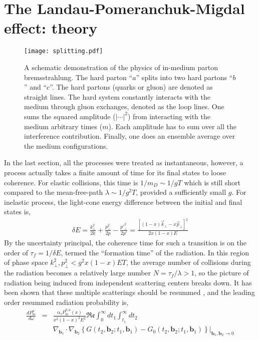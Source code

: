 \section{The Landau-Pomeranchuk-Migdal effect: theory}
\begin{figure}
\centering
\texttt{[image: splitting.pdf]}
\caption{A schematic demonstration of the physics of in-medium parton bremsstrahlung. The hard parton ``$a$'' splits into two hard partons ``$b$'' and ``$c$''. The hard partons (quarks or gluon) are denoted as straight lines. The hard system constantly interacts with the medium through gluon exchanges, denoted as the loop lines. One sums the squared amplitude ($|\cdots|^2$) from interacting with the medium arbitrary times ($m$). Each amplitude has to sum over all the interference contribution.
Finally, one does an ensemble average over the medium configurations.}
\label{fig:split}
\end{figure}
In the last section, all the processes were treated as instantaneous, however, a process actually takes a finite amount of time for its final states to loose coherence. 
For elastic collisions, this time is $1/m_D \sim 1/gT$ which is still short compared to the mean-free-path $\lambda \sim 1/g^2 T$, provided a sufficiently small $g$.
For inelastic process, the light-cone energy difference between the initial and final states is,
\begin{eqnarray}
\delta E = \frac{k_\perp^2}{2k} + \frac{p_\perp^2}{2p} - \frac{{p'}_\perp^2}{2{p'}} = \frac{ [(1-x)\vec{k}_\perp - x\vec{p}_\perp]^2}{2x(1-x)E}
\end{eqnarray}
By the uncertainty principal, the coherence time for such a transition is on the order of $\tau_f = 1/\delta E$, termed the ``formation time'' of the radiation. 
In this region of phase space $k_\perp^2, p_\perp^2 < g^2x(1-x)ET$, the average number of collisions during the radiation becomes a relatively large number $N = \tau_f/\lambda >1$, so the picture of radiation being induced from independent scattering centers breaks down.
It has been shown that these multiple scatterings should be resummed \cite{Zakharov:1996fv,Zakharov:1997uu,Baier:1996kr}, and the leading order resummed radiation probability is,
\begin{eqnarray}
\frac{dP^{a}_{bc}}{d\omega} &=& \frac{\alpha_s P^{0,a}_{bc}(x)}{x^2(1-x)^2 E^2}\mathfrak{Re}\int_0^\infty dt_1 \int_{t_1}^{\infty} dt_2\\\nonumber &&\nabla_{\mathbf{b}_1} \cdot\nabla_{\mathbf{b}_2} \left\{G(t_2, \mathbf{b}_2; t_1, \mathbf{b}_1) - G_0(t_2, \mathbf{b}_2; t_1, \mathbf{b}_1) \right\}|_{\mathbf{b}_1, \mathbf{b}_2 \rightarrow 0}
\label{eq:theory-dR}
\end{eqnarray}

